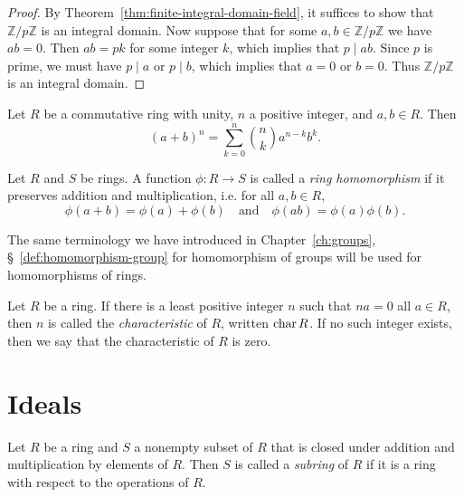 \begin{proof}
    By Theorem~\ref{thm:finite-integral-domain-field}, it suffices to show that
    \(\mathbb{Z}/p\mathbb{Z}\) is an integral domain. Now suppose that for some
    \(a, b \in \mathbb{Z}/p\mathbb{Z}\) we have \(ab = 0\). Then \(ab = pk\) for
    some integer \(k\), which implies that \(p \mid ab\). Since \(p\) is prime,
    we must have \(p \mid a\) or \(p \mid b\), which implies that \(a = 0\) or
    \(b = 0\). Thus \(\mathbb{Z}/p\mathbb{Z}\) is an integral domain.
\end{proof}

\begin{theorem}
    Let \(R\) be a commutative ring with unity, \(n\) a positive integer, and
    \(a, b \in R\). Then
    \[
        (a + b)^n = \sum_{k=0}^{n} \binom{n}{k} a^{n-k} b^k.
    \]
\end{theorem}

\begin{definition}
    Let \(R\) and \(S\) be rings. A function \(\phi: R \to S\) is called a
    \emph{ring homomorphism} if it preserves addition and multiplication, i.e.
    for all \(a, b \in R\),
    \[
        \phi(a + b) = \phi(a) + \phi(b) \quad \text{and} \quad \phi(ab) = \phi(a)\phi(b).
    \]

    The same terminology we have introduced in Chapter~\ref{ch:groups},
    \S~\ref{def:homomorphism-group} for homomorphism of groups will be used for
    homomorphisms of rings.
\end{definition}

\begin{definition}
    Let \(R\) be a ring. If there is a least positive integer \(n\) such that
    \(na = 0\) all \(a \in R\), then \(n\) is called the \emph{characteristic}
    of \(R\), written \(\operatorname{char} R\). If no such integer exists, then we say that
    the characteristic of \(R\) is zero.
\end{definition}

\section{Ideals}

\begin{definition}
    Let \(R\) be a ring and \(S\) a nonempty subset of \(R\) that is closed
    under addition and multiplication by elements of \(R\). Then \(S\) is called
    a \emph{subring} of \(R\) if it is a ring with respect to the operations of
    \(R\).
\end{definition}


